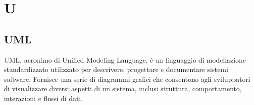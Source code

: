 \section{U} 
\subsection{UML} 
UML, acronimo di Unified Modeling Language, è un linguaggio di modellazione standardizzato utilizzato per descrivere, progettare e documentare sistemi software. Fornisce una serie di diagrammi grafici che consentono agli sviluppatori di visualizzare diversi aspetti di un sistema, inclusi struttura, comportamento, interazioni e flussi di dati. 

